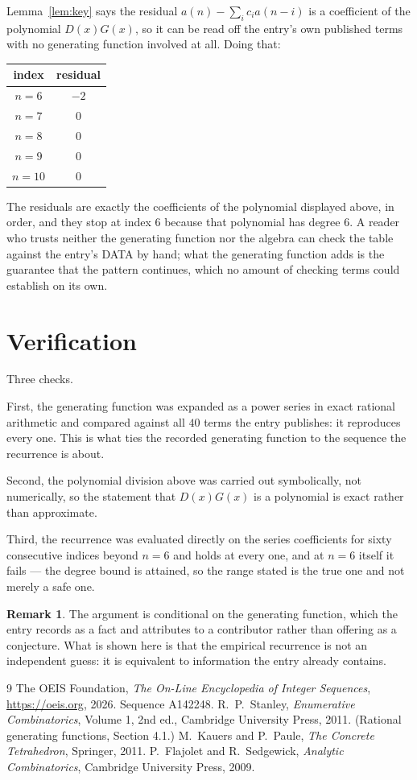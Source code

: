 \documentclass[11pt,a4paper]{article}
\theoremstyle{plain}
\theoremstyle{definition}
\newtheorem{remark}[theorem]{Remark}
\begin{document}
Lemma~\ref{lem:key} says the residual $a(n)-\sum_ic_ia(n-i)$ is a coefficient of the
polynomial $D(x)G(x)$, so it can be read off the entry's own published terms with no
generating function involved at all. Doing that:
\begin{center}
\begin{tabular}{cc}
index & residual \\ \hline
$n=6$ & $-2$ \\
$n=7$ & $0$ \\
$n=8$ & $0$ \\
$n=9$ & $0$ \\
$n=10$ & $0$
\end{tabular}
\end{center}
The residuals are exactly the coefficients of the polynomial displayed above, in order, and
they stop at index $6$ because that polynomial has degree $6$. A reader who trusts
neither the generating function nor the algebra can check the table against the entry's DATA
by hand; what the generating function adds is the guarantee that the pattern continues, which
no amount of checking terms could establish on its own.

\section{Verification}

Three checks.

First, the generating function was expanded as a power series in exact rational arithmetic and
compared against all $40$ terms the entry publishes: it reproduces every one. This is
what ties the recorded generating function to the sequence the recurrence is about.

Second, the polynomial division above was carried out symbolically, not numerically, so the
statement that $D(x)G(x)$ is a polynomial is exact rather than approximate.

Third, the recurrence was evaluated directly on the series coefficients for sixty consecutive
indices beyond $n=6$ and holds at every one, and at $n=6$ itself it fails --- the
degree bound is attained, so the range stated is the true one and not merely a safe one.

\begin{remark}
The argument is conditional on the generating function, which the entry records as a fact and
attributes to a contributor rather than offering as a conjecture. What is shown here is that
the empirical recurrence is not an independent guess: it is equivalent to information the
entry already contains.
\end{remark}

\begin{thebibliography}{9}
 The OEIS Foundation, \emph{The On-Line Encyclopedia of Integer
Sequences}, \url{https://oeis.org}, 2026. Sequence A142248.
 R.~P.~Stanley, \emph{Enumerative Combinatorics}, Volume 1, 2nd ed.,
Cambridge University Press, 2011. (Rational generating functions, Section 4.1.)
 M.~Kauers and P.~Paule, \emph{The Concrete Tetrahedron}, Springer, 2011.
 P.~Flajolet and R.~Sedgewick, \emph{Analytic Combinatorics}, Cambridge
University Press, 2009.
\end{thebibliography}
\end{document}
